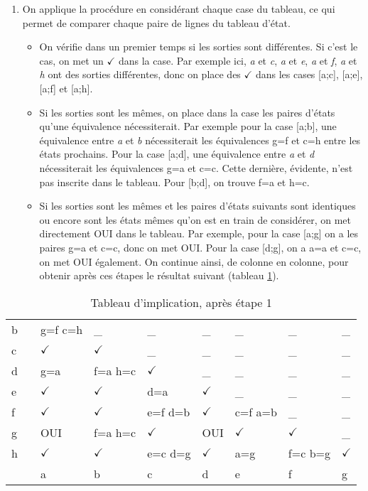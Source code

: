 \documentclass[11pt]{article}
\begin{document}
\begin{enumerate}
\item On applique la procédure en considérant chaque case du tableau, ce
qui permet de comparer chaque paire de lignes du tableau d'état.

\begin{itemize}
\item On vérifie dans un premier temps si les sorties sont
différentes. Si c'est le cas, on met un \(\checkmark\) dans la
case. Par exemple ici, \emph{a} et \emph{c}, \emph{a} et \emph{e}, \emph{a} et \emph{f}, \emph{a} et
\emph{h} ont des sorties différentes, donc on place des \(\checkmark\)
dans les cases [a;c], [a;e], [a;f] et [a;h].
\item Si les sorties sont les mêmes, on place dans la case les paires
d'états qu'une équivalence nécessiterait. Par exemple pour la
case [a;b], une équivalence entre \emph{a} et \emph{b} nécessiterait les
équivalences g=f et c=h entre les états prochains. Pour la case
[a;d], une équivalence entre \emph{a} et \emph{d} nécessiterait les
équivalences g=a et c=c. Cette dernière, évidente, n'est pas
inscrite dans le tableau. Pour [b;d], on trouve f=a et h=c.
\item Si les sorties sont les mêmes et les paires d'états suivants sont
identiques ou encore sont les états mêmes qu'on est en train de
considérer, on met directement OUI dans le tableau. Par exemple,
pour la case [a;g] on a les paires g=a et c=c, donc on met
OUI. Pour la case [d;g], on a a=a et c=c, on met OUI
également. On continue ainsi, de colonne en colonne, pour obtenir
après ces étapes le résultat suivant (tableau \ref{tab:orgd574134}).
\end{itemize}
\end{enumerate}

\begin{table}[htbp]
\caption{\label{tab:orgd574134}Tableau d'implication, après étape 1}
\centering
\begin{tabular}{lllllllll}
b &  & g=f c=h & \_ & \_ & \_ & \_ & \_ & \_\\
c &  & \(\checkmark\) & \(\checkmark\) & \_ & \_ & \_ & \_ & \_\\
d &  & g=a & f=a h=c & \(\checkmark\) & \_ & \_ & \_ & \_\\
e &  & \(\checkmark\) & \(\checkmark\) & d=a & \(\checkmark\) & \_ & \_ & \_\\
f &  & \(\checkmark\) & \(\checkmark\) & e=f d=b & \(\checkmark\) & c=f a=b & \_ & \_\\
g &  & OUI & f=a h=c & \(\checkmark\) & OUI & \(\checkmark\) & \(\checkmark\) & \_\\
h &  & \(\checkmark\) & \(\checkmark\) & e=c d=g & \(\checkmark\) & a=g & f=c b=g & \(\checkmark\)\\
\hline
 &  & a & b & c & d & e & f & g\\
\end{tabular}
\end{table}
\end{document}
